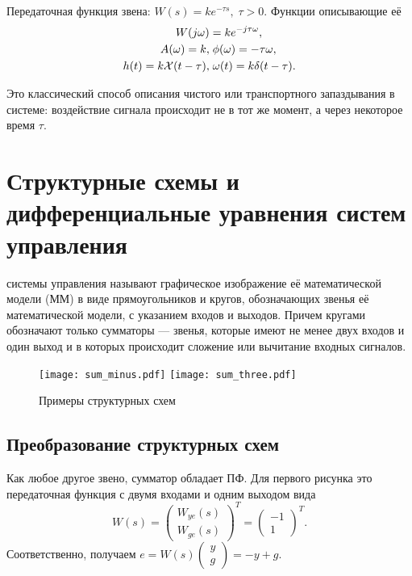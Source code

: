\documentclass[../../TAU.tex]{subfiles}
\begin{document}
\begin{description}
    Передаточная функция звена: $W(s) = ke^{-\tau s},\; \tau > 0$. Функции описывающие её
    $$
        \begin{aligned}
            W(j\omega) &= ke^{-j\tau\omega},\\
            A(\omega) = k,&\; \phi(\omega) = -\tau\omega,\\
            h(t) = k\mathcal{X}(t-\tau),&\; \omega(t) = k\delta(t-\tau).
        \end{aligned}
    $$

    Это классический способ описания чистого или транспортного запаздывания в системе: воздействие сигнала происходит не в тот же момент, а через некоторое время $\tau$.
\end{description}

\section{Структурные схемы и дифференциальные уравнения систем управления}

     системы управления называют графическое изображение её математической модели (ММ) в виде прямоугольников и кругов, обозначающих звенья её математической модели, с указанием входов и выходов. Причем кругами обозначают только сумматоры --- звенья, которые имеют не менее двух входов и один выход и в которых происходит сложение или вычитание входных сигналов.

    \begin{figure}[h]
        \centering
        \texttt{[image: sum\_minus.pdf]}
        \texttt{[image: sum\_three.pdf]}
        \caption{Примеры структурных схем}
        \centering
    \end{figure}

\subsection{Преобразование структурных схем}

    Как любое другое звено, сумматор обладает ПФ. Для первого рисунка это передаточная функция с двумя входами и одним выходом вида
    $$
        W(s) =
        \begin{pmatrix}
            W_{ye}(s)\\
            W_{ge}(s)
        \end{pmatrix}^T =
        \begin{pmatrix}
            -1\\
            1
        \end{pmatrix}^T.
    $$
    Соответственно, получаем 
    $e = W(s)\begin{pmatrix}y\\g\end{pmatrix} = -y+g$.
\end{document}
